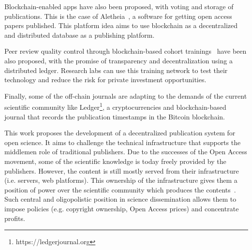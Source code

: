 Blockchain-enabled apps have also been proposed, with voting and storage of
publications. This is the case of Aletheia~\cite{morton2017aletheia}, a software
for getting open access papers published. This platform idea aims to use
blockchain as a decentralized and distributed database as a publishing platform.

Peer review quality control through blockchain-based cohort
trainings~\cite{dhillon2016bench} have been also proposed, with the promise of
transparency and decentralization using a distributed ledger. Research labs can
use this training network to test their technology and reduce the risk for
private investment opportunities.

Finally, some of the off-chain journals are adapting to the demands of the
current scientific community like Ledger\footnote{https://ledgerjournal.org}, a
cryptocurrencies and blockchain-based journal that records the publication
timestamps in the Bitcoin blockchain.

This work proposes the development of a decentralized publication system for
open science. It aims to challenge the technical infrastructure that supports
the middlemen role of traditional publishers. Due to the successes of the Open
Access movement, some of the scientific knowledge is today freely provided by
the publishers. However, the content is still mostly served from their
infrastructure (i.e. servers, web platforms). This ownership of the
infrastructure gives them a position of power over the scientific community
which produces the contents~\cite{fuster2010governance}. Such central and
oligopolistic position in science dissemination allows them to impose policies
(e.g. copyright ownership, Open Access prices) and concentrate profits.


